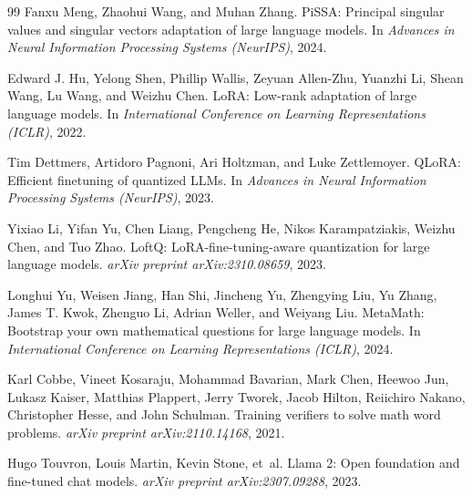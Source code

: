 \documentclass[mlmain]{jmlr}
\begin{document}
\begin{thebibliography}{99}
Fanxu Meng, Zhaohui Wang, and Muhan Zhang.
\newblock PiSSA: Principal singular values and singular vectors adaptation of large language models.
\newblock In \emph{Advances in Neural Information Processing Systems (NeurIPS)}, 2024.

Edward J. Hu, Yelong Shen, Phillip Wallis, Zeyuan Allen-Zhu, Yuanzhi Li, Shean Wang, Lu Wang, and Weizhu Chen.
\newblock LoRA: Low-rank adaptation of large language models.
\newblock In \emph{International Conference on Learning Representations (ICLR)}, 2022.

Tim Dettmers, Artidoro Pagnoni, Ari Holtzman, and Luke Zettlemoyer.
\newblock QLoRA: Efficient finetuning of quantized LLMs.
\newblock In \emph{Advances in Neural Information Processing Systems (NeurIPS)}, 2023.

Yixiao Li, Yifan Yu, Chen Liang, Pengcheng He, Nikos Karampatziakis, Weizhu Chen, and Tuo Zhao.
\newblock LoftQ: LoRA-fine-tuning-aware quantization for large language models.
\newblock \emph{arXiv preprint arXiv:2310.08659}, 2023.

Longhui Yu, Weisen Jiang, Han Shi, Jincheng Yu, Zhengying Liu, Yu Zhang, James T. Kwok, Zhenguo Li, Adrian Weller, and Weiyang Liu.
\newblock MetaMath: Bootstrap your own mathematical questions for large language models.
\newblock In \emph{International Conference on Learning Representations (ICLR)}, 2024.

Karl Cobbe, Vineet Kosaraju, Mohammad Bavarian, Mark Chen, Heewoo Jun, Lukasz Kaiser, Matthias Plappert, Jerry Tworek, Jacob Hilton, Reiichiro Nakano, Christopher Hesse, and John Schulman.
\newblock Training verifiers to solve math word problems.
\newblock \emph{arXiv preprint arXiv:2110.14168}, 2021.

Hugo Touvron, Louis Martin, Kevin Stone, et~al.
\newblock Llama 2: Open foundation and fine-tuned chat models.
\newblock \emph{arXiv preprint arXiv:2307.09288}, 2023.
\end{thebibliography}
\end{document}
